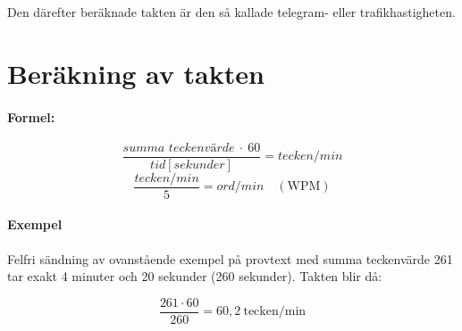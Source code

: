 Den därefter beräknade takten är den så kallade telegram- eller trafikhastigheten.

\newpage
\section[Taktberäkning]{Beräkning av takten}

\paragraph{Formel:}
\[\frac{\textit{summa\ teckenvärde}\ \cdot\ 60}{\textit{tid} [\textit{sekunder}]}
= \textit{tecken/min}\]
\[\frac{\textit{tecken/min}}{5} = \textit{ord/min}\quad (\text{WPM})\]

\paragraph{Exempel}
Felfri sändning av ovanstående exempel på provtext  med
summa teckenvärde 261 tar exakt 4 minuter och 20 sekunder (260 sekunder).
Takten blir då:

$$\frac{261 \cdot 60}{260} = 60,2\ \mathrm{tecken/min}$$

\label{morsealfabetet}


